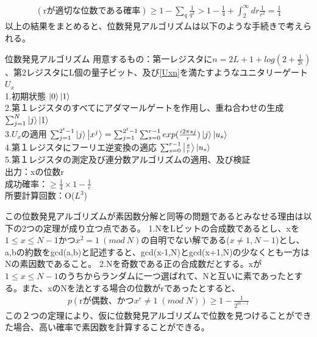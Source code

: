 \documentclass[a4paper,10.5pt]{article}
\numberwithin{equation}{section}
\begin{document}
\begin{equation}\begin{split}
    (\text{rが適切な位数である確率}) 
    \geq 1 - \sum_{q} \frac{1}{q^{2}}
    > 1 - \frac{1}{4} +\int_{2}^{\infty} dr \frac{1}{r^{2}}
    = \frac{1}{4}
\end{split} \end{equation}
以上の結果をまとめると、位数発見アルゴリズムは以下のような手続きで考えられる。
\begin{itembox}[l]{位数発見アルゴリズム}
用意するもの：第一レジスタに$n=2L+1+log(2+\frac{1}{2\epsilon})$、第2レジスタにL個の量子ビット、及び\eqref{Uxn}を満たすようなユニタリーゲート$U_{x}$\\
1.初期状態      $\ket{0}\ket{1}$ \\
2.第１レジスタのすべてにアダマールゲートを作用し、重ね合わせの生成 $\sum_{j=1}^{N}\ket{j}\ket{1}$\\
3.$U_{x}$の適用 $\sum_{j=1}^{2^{t}-1}\ket{j}\ket{x^{j}} = \sum_{j=1}^{2^{t}-1} \sum_{s=0}^{r-1} exp(\frac{i2\pi s j}{r})\ket{j}\ket{u_{s}}$\\
4.第１レジスタにフーリエ逆変換の適応  $\sum_{s=0}^{r-1}\ket{\frac{s}{r}}\ket{u_{s}}$\\
5.第１レジスタの測定及び連分数アルゴリズムの適用、及び検証\\
出力：xの位数r\\
成功確率：$\geq \frac{1}{4} \times 1-\frac{1}{e}$\\
所要計算回数：O($L^{3}$)\\
\end{itembox}
この位数発見アルゴリズムが素因数分解と同等の問題であるとみなせる理由は以下の2つの定理が成り立つ点である。
1.NをLビットの合成数であるとし、xを$1\leq x \leq N-1$かつ$x^{2}=1\:(mod\:N)$の自明でない解である($x\neq 1,N-1$)とし、a,bの約数をgcd(a,b)と記述すると、gcd(x-1,N)とgcd(x+1,N)の少なくとも一方はNの素因数であること。
2.Nを奇数である正の合成数だとする。xが$1\leq x \leq N-1$のうちからランダムに一つ選ばれて、Nと互いに素であったとする。また、xのNを法とする場合の位数がrであったとすると、
\begin{equation}\begin{split}
    p(\text{rが偶数、かつ}x^{r} \neq 1\;(mod\;N)) \geq 1 - \frac{1}{2^{m-1}} 
\end{split} \end{equation}
この２つの定理により、仮に位数発見アルゴリズムで位数を見つけることができた場合、高い確率で素因数を計算することができる。
\end{document}

